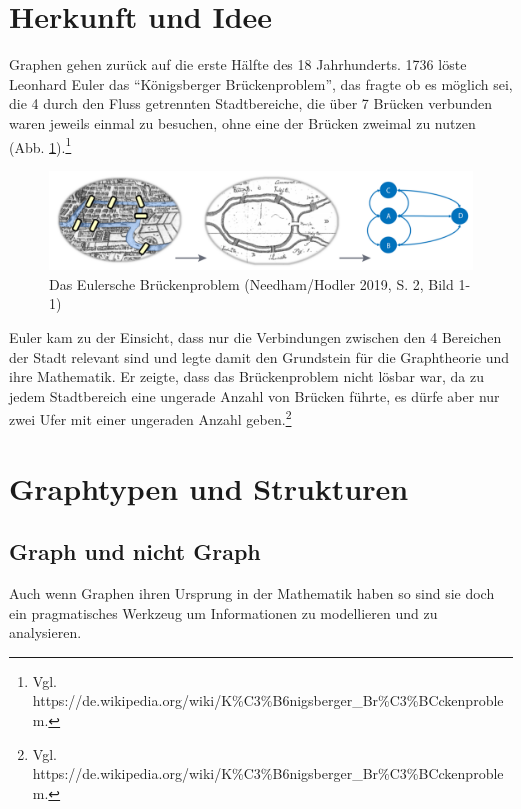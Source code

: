 \documentclass[ngerman,]{scrreprt}
\begin{document}
\hypertarget{herkunft-und-idee}{%
\section{Herkunft und Idee}\label{herkunft-und-idee}}

Graphen gehen zurück auf die erste Hälfte des 18 Jahrhunderts. 1736 löste Leonhard Euler das ``Königsberger Brückenproblem'', das fragte ob es möglich sei, die 4 durch den Fluss getrennten Stadtbereiche, die über 7 Brücken verbunden waren jeweils einmal zu besuchen, ohne eine der Brücken zweimal zu nutzen (Abb. \ref{euler}).\footnote{Vgl. https://de.wikipedia.org/wiki/K\%C3\%B6nigsberger\_Br\%C3\%BCckenproblem.}

\begin{figure}
\centering
\includegraphics{Bilder/Eulersche-Bruecken.png}
\caption{Das Eulersche Brückenproblem (Needham/Hodler 2019, S. 2, Bild 1-1)}
\label{euler}
\end{figure}

Euler kam zu der Einsicht, dass nur die Verbindungen zwischen den 4 Bereichen der Stadt relevant sind und legte damit den Grundstein für die Graphtheorie und ihre Mathematik. Er zeigte, dass das Brückenproblem nicht lösbar war, da zu jedem Stadtbereich eine ungerade Anzahl von Brücken führte, es dürfe aber nur zwei Ufer mit einer ungeraden Anzahl geben.\footnote{Vgl. https://de.wikipedia.org/wiki/K\%C3\%B6nigsberger\_Br\%C3\%BCckenproblem.}

\hypertarget{graphtypen-und-strukturen}{%
\section{Graphtypen und Strukturen}\label{graphtypen-und-strukturen}}

\hypertarget{graph-und-nicht-graph}{%
\subsection{Graph und nicht Graph}\label{graph-und-nicht-graph}}

Auch wenn Graphen ihren Ursprung in der Mathematik haben so sind sie doch ein pragmatisches Werkzeug um Informationen zu modellieren und zu analysieren.
\end{document}
